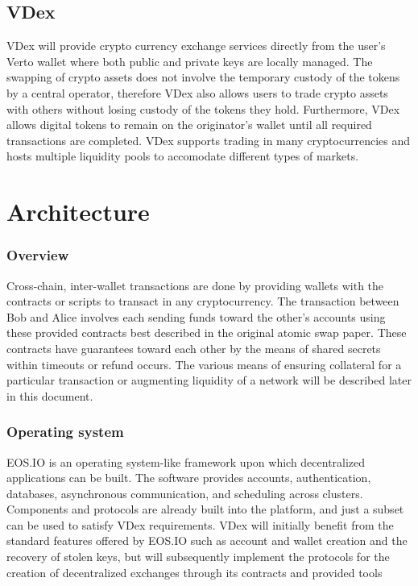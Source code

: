 \documentclass[]{article}
\begin{document}
\subsection {VDex}

VDex will provide crypto currency exchange services directly from the user's Verto wallet where both public and private keys are locally managed.
The swapping of crypto assets does not involve the temporary custody of the tokens by a central operator, 
therefore VDex also allows users to trade crypto assets with others without losing custody of the tokens they hold. 
Furthermore, VDex allows digital tokens to remain on the originator's wallet until all required transactions are completed. 
VDex supports trading in many cryptocurrencies and hosts multiple liquidity pools to accomodate different types of markets.


									
\section{Architecture}
	
	\subsubsection{Overview}
	Cross-chain, inter-wallet transactions are done by providing wallets with the contracts or scripts to transact in any cryptocurrency. 
	The transaction between Bob and Alice involves each sending funds toward the other's accounts 
	using these provided contracts best described in the original atomic swap paper.\cite{22} 
	These contracts have guarantees toward each other by the means of shared secrets within timeouts or refund occurs. 
	The various means of ensuring collateral for a particular transaction or augmenting liquidity of a network 
	will be described later in this document.
  
	\subsubsection{Operating system}
	EOS.IO is an operating system-like framework upon which decentralized applications can be built. 
	The software provides accounts, authentication, databases, asynchronous communication, and scheduling across clusters. 
	Components and protocols are already built into the platform, and just a subset can be used to satisfy VDex requirements. 
	VDex will initially benefit from the standard features offered by EOS.IO such as account and wallet creation 
	and the recovery of stolen keys, but will subsequently implement the protocols 
	for the creation of decentralized exchanges through its contracts and provided tools	\cite{3}\\
  
\end{document}
